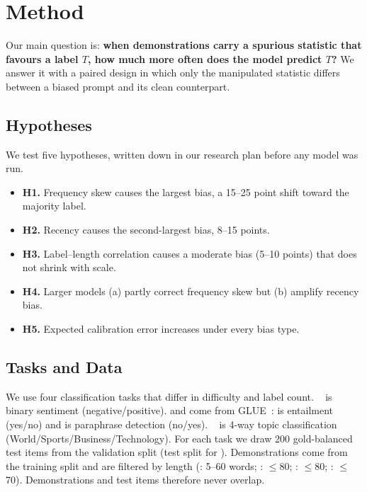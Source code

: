 \section{Method}
\label{sec:method}

Our main question is: {\bf when demonstrations carry a spurious statistic that favours a label $T$, how much more often does the model predict $T$?} We answer it with a paired design in which only the manipulated statistic differs between a biased prompt and its clean counterpart.

\subsection{Hypotheses}
\label{sec:hypotheses}
We test five hypotheses, written down in our research plan before any model was run.
\begin{itemize}[leftmargin=*,itemsep=0pt,topsep=0pt]
    \item \textbf{H1.} Frequency skew causes the largest bias, a 15--25 point shift toward the majority label.
    \item \textbf{H2.} Recency causes the second-largest bias, 8--15 points.
    \item \textbf{H3.} Label--length correlation causes a moderate bias (5--10 points) that does not shrink with scale.
    \item \textbf{H4.} Larger models (a) partly correct frequency skew but (b) amplify recency bias.
    \item \textbf{H5.} Expected calibration error increases under every bias type.
\end{itemize}

\subsection{Tasks and Data}
We use four classification tasks that differ in difficulty and label count. \sst~\citep{socher2013recursive} is binary sentiment (negative/positive). \rte and \mrpc come from GLUE~\citep{wang2018glue}: \rte is entailment (yes/no) and \mrpc is paraphrase detection (no/yes). \agnews~\citep{zhang2015character} is 4-way topic classification (World/Sports/Business/Technology). For each task we draw 200 gold-balanced test items from the validation split (test split for \agnews). Demonstrations come from the training split and are filtered by length (\sst: 5--60 words; \rte: $\le$80; \agnews: $\le$80; \mrpc: $\le$70). Demonstrations and test items therefore never overlap.

